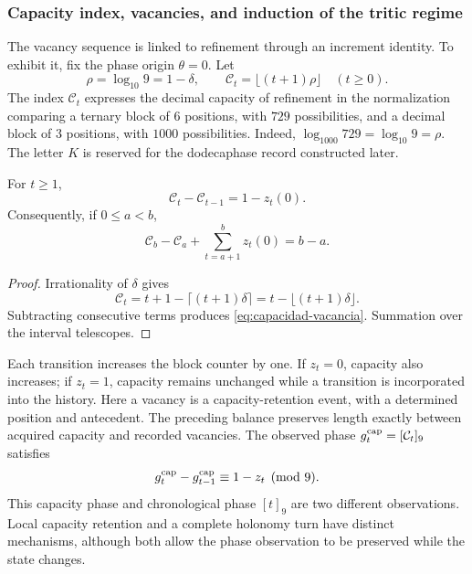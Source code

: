 \subsubsection{Capacity index, vacancies, and induction of the tritic regime}
\label{vac-capacidad-trit}

The vacancy sequence is linked to refinement through an increment identity.
To exhibit it, fix the phase origin \(\theta=0\). Let
\[
 \rho=\log_{10}9=1-\delta,\qquad
 \mathcal C_t=\lfloor(t+1)\rho\rfloor\quad(t\geq0).
\]
The index \(\mathcal C_t\) expresses the decimal capacity of refinement
in the normalization comparing a ternary block of \(6\) positions,
with \(729\) possibilities, and a decimal block of \(3\) positions,
with \(1000\) possibilities. Indeed,
\(\log_{1000}729=\log_{10}9=\rho\). The letter \(K\) is reserved
for the dodecaphase record constructed later.

\begin{proposition}
\label{prop:capacidad-vacancia}
For \(t\geq1\),
\begin{equation}
 \mathcal C_t-\mathcal C_{t-1}=1-z_t(0).
 \label{eq:capacidad-vacancia}
\end{equation}
Consequently, if \(0\leq a<b\),
\[
 \mathcal C_b-\mathcal C_a+
 \sum_{t=a+1}^{b}z_t(0)=b-a.
\]
\end{proposition}
\begin{proof}
Irrationality of \(\delta\) gives
\[
 \mathcal C_t
 =t+1-\lceil(t+1)\delta\rceil
 =t-\lfloor(t+1)\delta\rfloor.
\]
Subtracting consecutive terms produces \eqref{eq:capacidad-vacancia}.
Summation over the interval telescopes.
\end{proof}

Each transition increases the block counter by one. If \(z_t=0\),
capacity also increases; if \(z_t=1\), capacity remains unchanged
while a transition is incorporated into the history. Here a vacancy
is a capacity-retention event, with a determined position and antecedent.
The preceding balance preserves length exactly between acquired capacity
and recorded vacancies. The observed phase \(g_t^{\rm cap}=[\mathcal C_t]_9\)
satisfies
\[
 g_t^{\rm cap}-g_{t-1}^{\rm cap}\equiv1-z_t\pmod9.
\]
This capacity phase and chronological phase \([t]_9\) are two
different observations. Local capacity retention and a complete holonomy
turn have distinct mechanisms, although both allow the phase observation
to be preserved while the state changes.

